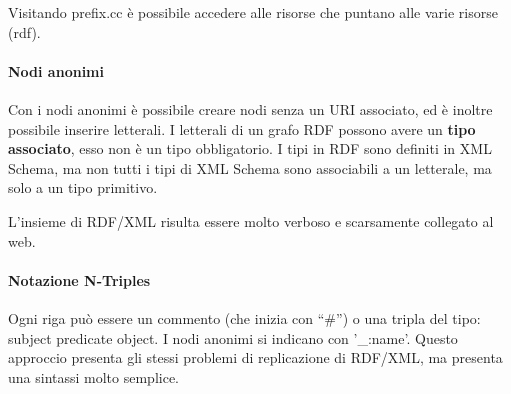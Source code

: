 Visitando prefix.cc \`e possibile accedere alle risorse che puntano alle varie risorse (rdf).

\paragraph*{Nodi anonimi}
Con i nodi anonimi \`e possibile creare nodi senza un URI associato, ed \`e inoltre possibile inserire letterali. I letterali di un grafo RDF possono avere un \textbf{tipo associato}, esso non \`e un tipo obbligatorio. I tipi in RDF sono definiti in XML Schema, ma non tutti i tipi di XML Schema sono associabili a un letterale, ma solo a un tipo primitivo. \newline

L'insieme di RDF/XML risulta essere molto verboso e scarsamente collegato al web.

\paragraph*{Notazione N-Triples}

Ogni riga pu\`o essere un commento (che inizia con ``\#'') o una tripla del tipo: subject predicate object.
I nodi anonimi si indicano con '\_:name'.
Questo approccio presenta gli stessi problemi di replicazione di RDF/XML, ma presenta una sintassi molto semplice.
